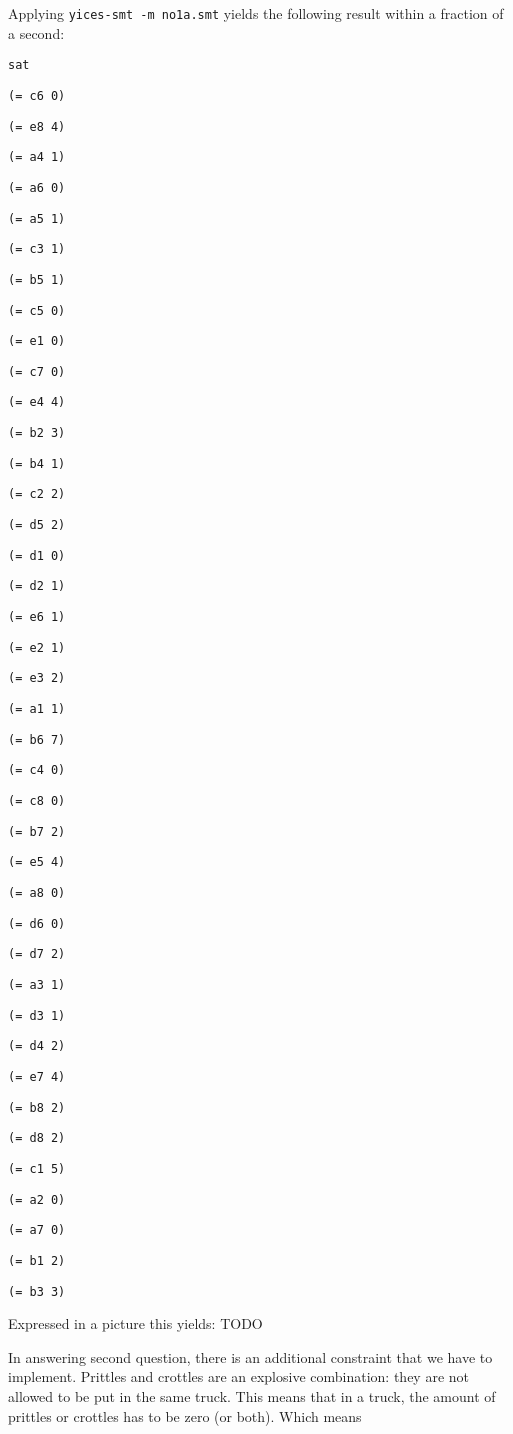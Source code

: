 \documentclass[12pt]{article}
\begin{document}
Applying {\tt yices-smt -m no1a.smt} yields the following result
within a fraction of a second: 
{ \footnotesize
{\tt sat }

{\tt  }

{\tt (= c6 0) }

{\tt (= e8 4) }

{\tt (= a4 1) }

{\tt (= a6 0) }

{\tt (= a5 1) }

{\tt (= c3 1) }

{\tt (= b5 1) }

{\tt (= c5 0) }

{\tt (= e1 0) }

{\tt (= c7 0) }

{\tt (= e4 4) }

{\tt (= b2 3) }

{\tt (= b4 1) }

{\tt (= c2 2) }

{\tt (= d5 2) }

{\tt (= d1 0) }

{\tt (= d2 1) }

{\tt (= e6 1) }

{\tt (= e2 1) }

{\tt (= e3 2) }

{\tt (= a1 1) }

{\tt (= b6 7) }

{\tt (= c4 0) }

{\tt (= c8 0) }

{\tt (= b7 2) }

{\tt (= e5 4) }

{\tt (= a8 0) }

{\tt (= d6 0) }

{\tt (= d7 2) }

{\tt (= a3 1) }

{\tt (= d3 1) }

{\tt (= d4 2) }

{\tt (= e7 4) }

{\tt (= b8 2) }

{\tt (= d8 2) }

{\tt (= c1 5) }

{\tt (= a2 0) }

{\tt (= a7 0) }

{\tt (= b1 2) }

{\tt (= b3 3) }

{\tt  }
}
Expressed in a picture this yields: TODO

In answering second question, there is an additional constraint that we have to implement. Prittles and crottles are an explosive combination: they are not allowed to be put in the same truck. This means that in a truck, the amount of prittles or crottles has to be zero (or both). Which means
\end{document}
